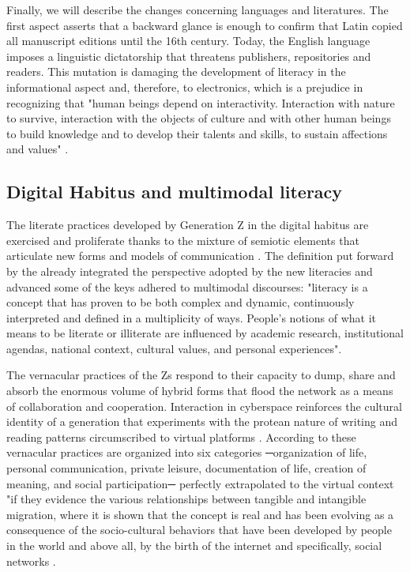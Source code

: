 \documentclass[english]{textolivre}
\begin{document}
Finally, we will describe the changes concerning languages and literatures. The first aspect asserts that a backward glance is enough to confirm that Latin copied all manuscript editions until the 16th century. Today, the English language imposes a linguistic dictatorship that threatens publishers, repositories and readers. This mutation is damaging the development of literacy in the informational aspect and, therefore, to electronics, which is a prejudice in recognizing that "human beings depend on interactivity. Interaction with nature to survive, interaction with the objects of culture and with other human beings to build knowledge and to develop their talents and skills, to sustain affections and values" \cite[p.5]{fagundes2007escuela}.


\subsection{Digital Habitus and multimodal literacy}
The literate practices developed by Generation Z in the digital habitus \cite{bourdieu_distincion:_1988} are exercised and proliferate thanks to the mixture of semiotic elements that articulate new forms and models of communication \cite{kalantzis2016literacies}. The definition put forward by the \textcite[p.~147]{unesco_literacy_2006} already integrated the perspective adopted by the new literacies and advanced some of the keys adhered to multimodal discourses: "literacy is a concept that has proven to be both complex and dynamic, continuously interpreted and defined in a multiplicity of ways. People's notions of what it means to be literate or illiterate are influenced by academic research, institutional agendas, national context, cultural values, and personal experiences".

The vernacular practices of the Zs respond to their capacity to dump, share and absorb the enormous volume of hybrid forms that flood the network as a means of collaboration and cooperation. Interaction in cyberspace reinforces the cultural identity \cite{castells2004estado} of a generation that experiments with the protean nature of writing and reading patterns circumscribed to virtual platforms \cite{curwood_ipoetry:_2011}. According to \textcite{barton2000situated} these vernacular practices are organized into six categories ─organization of life, personal communication, private leisure, documentation of life, creation of meaning, and social participation─ perfectly extrapolated to the virtual context "if they evidence the various relationships between tangible and intangible migration, where it is shown that the concept is real and has been evolving as a consequence of the socio-cultural behaviors that have been developed by people in the world and above all, by the birth of the internet and specifically, social networks \cite[p.96]{buendia2016redes}. 
\end{document}
